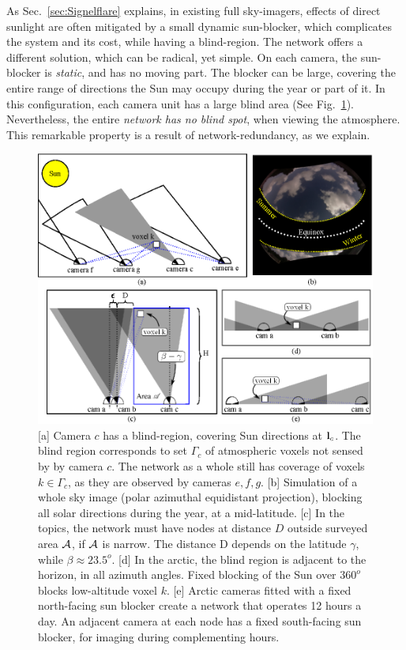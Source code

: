 \documentclass[runningheads]{llncs}
\begin{document}
As Sec.~\ref{sec:Signelflare} explains, in existing full sky-imagers, effects of direct sunlight are often mitigated by a small dynamic sun-blocker, which complicates the system and its cost, while having a blind-region. The network offers a different solution, which can be radical, yet simple. On each camera, the sun-blocker is {\em static}, and has no moving part. The blocker can be large, covering the entire range of directions the Sun may occupy during the year or part of it. In this configuration, each camera unit has a large blind area (See Fig.~\ref{fig:blindspot}). Nevertheless, the entire {\em network has no blind spot}, when viewing the atmosphere. This remarkable property is a result of network-redundancy, as we explain.
\begin{figure}[t!]
\begin{center}
   \includegraphics[width=0.8\linewidth]{figures/sun_blocks2.eps}
\end{center}
   \vspace{-0.6cm}
   \caption{[a] Camera $c$ has a blind-region, covering Sun directions at ${\bf l}_c$. The blind region corresponds to set $\Gamma_c$ of atmospheric voxels not sensed by by camera $c$. The network as a whole still has coverage of voxels $k\in\Gamma_c$, as they are observed by cameras $e,f,g$.
   [b] Simulation of a whole sky image (polar azimuthal equidistant projection), blocking
   all solar directions during the year, at a mid-latitude.
   [c] In the topics, the network must have nodes at distance $D$ outside surveyed area ${\cal A}$, if ${\cal A}$ is narrow.  The distance D depends on the latitude $\gamma$, while
   $\beta\approx23.5^o$.
   [d] In the arctic, the blind region is adjacent to the horizon, in all azimuth angles. Fixed blocking of the Sun over $360^o$  blocks low-altitude voxel $k$. [e] Arctic cameras fitted with a fixed north-facing sun blocker create a network   that operates 12 hours a day. An adjacent camera at each node has a fixed south-facing sun blocker, for imaging during complementing hours.
   }
\label{fig:blindspot}
\end{figure}
\end{document}
